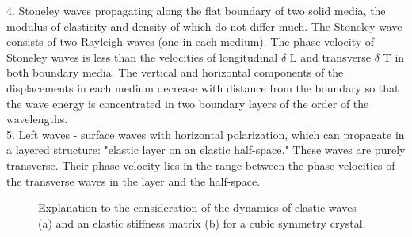 \documentclass[a4paper,14pt]{extreport}
\begin{document}
4. Stoneley waves propagating along the flat boundary of two solid media, the modulus of elasticity and density of which do not differ much.
The Stoneley wave consists of two Rayleigh waves (one in each medium). The phase velocity of Stoneley waves is less than the velocities of longitudinal $ \delta $ L and transverse $ \delta $ T in both boundary media. The vertical and horizontal components of the displacements in each medium decrease with distance from the boundary so that the wave energy is concentrated in two boundary layers of the order of the wavelengths. \\

5. Left waves - surface waves with horizontal polarization, which can propagate in a layered structure: "elastic layer on an elastic half-space." These waves are purely transverse. Their phase velocity lies in the range between the phase velocities of the transverse waves in the layer and the half-space.


















\begin{figure}[h]
\caption{Explanation to the consideration of the dynamics of elastic waves (a)
and an elastic stiffness matrix (b) for a cubic symmetry crystal.}
\label{ris1}
\end{figure}
\end{document}
